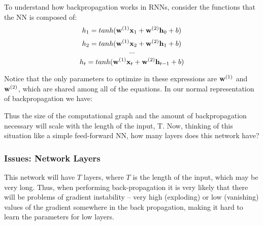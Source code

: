 \documentclass{article}
\begin{document}
To understand how backpropagation works in RNNs, consider the functions that the NN is composed of:
$$h_{1} = tanh(\bold{w}^{(1)}\bold{x}_{1} + \bold{w}^{(2)}\bold{h}_{0} + b)$$
$$h_{2} = tanh(\bold{w}^{(1)}\bold{x}_{2} + \bold{w}^{(2)}\bold{h}_{1} + b)$$
$$\dots$$
$$h_{t} = tanh(\bold{w}^{(1)}\bold{x}_{t} + \bold{w}^{(2)}\bold{h}_{t-1} + b)$$

Notice that the only parameters to optimize in these expressions are $\bold{w}^{(1)}$ and $\bold{w}^{(2)}$, which are shared among all of the equations. In our normal representation of backpropagation we have:


\begin{center}
\end{center}

Thus the size of the computational graph and the amount of backpropagation necessary will scale with the length of the input, T. Now, thinking of this situation like a simple feed-forward NN, how many layers does this network have?

\subsubsection{Issues: Network Layers}

This network will have $T$ layers, where $T$ is the length of the input, which may be very long. Thus, when performing back-propagation it is very likely that there will be problems of gradient instability -- very high (exploding) or low (vanishing) values of the gradient somewhere in the back propagation, making it hard to learn the parameters for low layers.
\end{document}
